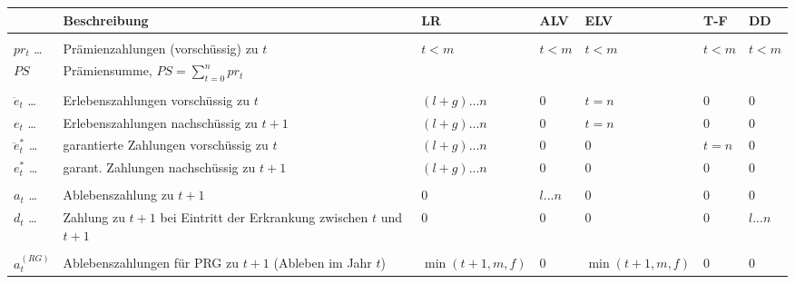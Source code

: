 \documentclass[a4paper,10pt]{article}
\begin{document}
\begin{center}


\begin{tabular}{lp{6.5cm}v{1.6cm}v{1.5cm}v{1.5cm}v{1cm}v{1cm}}
& Beschreibung & LR & ALV & ELV & T-F & DD\\\hline\\[0.01em]
$pr_t$  \dots          & Prämienzahlungen (vorschüssig) zu $t$ & $t<m$ & $t<m$ & $t<m$ & $t<m$ & $t<m$ \\
$PS$                   & Prämiensumme, $PS=\sum_{t=0}^n pr_t$\\[0.5em]\hline\\[0em]

$\ddot{e}_t$  \dots    & Erlebenszahlungen vorschüssig zu $t$ & $(l+g)...n$ & 0 & $t=n$ & 0 & 0 \\
$e_t$  \dots           & Erlebenszahlungen nachschüssig zu $t+1$& $(l+g)...n$ & 0 & $t=n$ & 0 & 0 \\
$\ddot{e}_t^{*}$ \dots & garantierte Zahlungen vorschüssig zu $t$ & $(l+g)...n$ & 0 & 0  & $t=n$ & 0 \\
$e_t^{*}$  \dots       & garant. Zahlungen nachschüssig zu $t+1$ & $(l+g)...n$ & 0 & 0  & 0 & 0 \\[0.5em]\hline\\[0em]

$a_t$  \dots           & Ablebenszahlung zu $t+1$ & 0 & $l...n$ & 0 & 0 & 0 \\
$d_t$  \dots           & Zahlung zu $t+1$ bei Eintritt der Erkrankung zwischen $t$ und $t+1$ & 0 & 0 & 0 & 0& $l...n$ \\[0.5em]\hline\\[0em]
$a_t^{(RG)}$           & Ablebenszahlungen für PRG zu $t+1$ (Ableben im Jahr $t$) & $\min(t+1, m, f)$ & 0 & $\min(t+1,m,f)$ & 0 & 0 \\[0.5em]\hline

\end{tabular}
\end{center}
\end{document}
